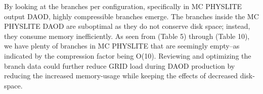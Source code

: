 By looking at the branches per configuration, specifically in MC PHYSLITE output DAOD, highly compressible branches emerge. The branches inside the MC PHYSLITE DAOD are suboptimal as they do not conserve disk space; instead, they consume memory inefficiently. As seen from (Table 5) through (Table 10), we have plenty of branches in MC PHYSLITE that are seemingly empty--as indicated by the compression factor being O(10). Reviewing and optimizing the branch data could further reduce GRID load during DAOD production by reducing the increased memory-usage while keeping the effects of decreased disk-space. 
